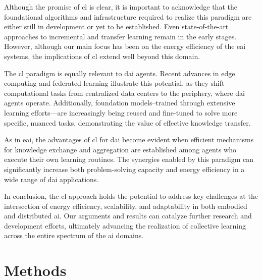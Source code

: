 \documentclass[12pt]{article}
\begin{document}
Although the promise of \ac{cl} is clear, it is important to acknowledge that the foundational algorithms and infrastructure required to realize this paradigm are either still in development or yet to be established. Even state-of-the-art approaches to incremental and transfer learning remain in the early stages. However, although our main focus has been on the energy efficiency of the \ac{eai} systems, the implications of \ac{cl} extend well beyond this domain.

The \ac{cl} paradigm is equally relevant to \ac{dai} agents. Recent advances in edge computing and federated learning illustrate this potential, as they shift computational tasks from centralized data centers to the periphery, where \ac{dai} agents operate. Additionally, foundation models--trained through extensive learning efforts---are increasingly being reused and fine-tuned to solve more specific, nuanced tasks, demonstrating the value of effective knowledge transfer.

As in \ac{eai}, the advantages of \ac{cl} for \ac{dai} become evident when efficient mechanisms for knowledge exchange and aggregation are established among agents who execute their own learning routines. The synergies enabled by this paradigm can significantly increase both problem-solving capacity and energy efficiency in a wide range of \ac{dai} applications.

In conclusion, the \acl{cl} approach holds the potential to address key challenges at the intersection of energy efficiency, scalability, and adaptability in both embodied and distributed \ac{ai}. Our arguments and results can catalyze further research and development efforts, ultimately advancing the realization of collective learning across the entire spectrum of the \ac{ai} domains.

\section*{Methods}\label{sec:methods}
\end{document}
